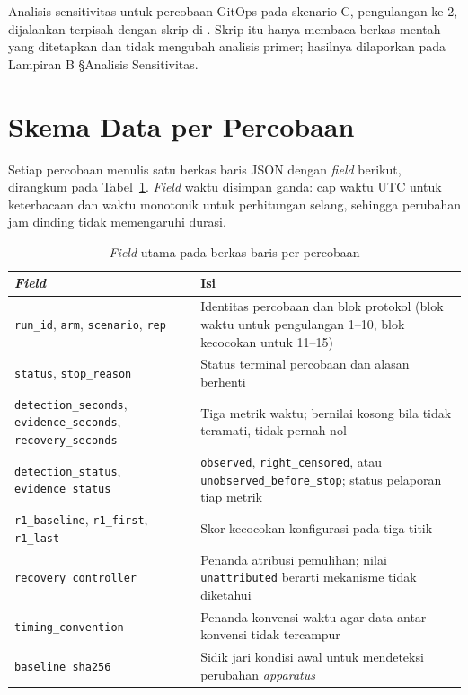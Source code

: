Analisis sensitivitas untuk percobaan GitOps pada skenario C, pengulangan ke-2, dijalankan terpisah dengan skrip di . Skrip itu hanya membaca berkas mentah yang ditetapkan dan tidak mengubah analisis primer; hasilnya dilaporkan pada Lampiran B §Analisis Sensitivitas.

\section{Skema Data per Percobaan}

Setiap percobaan menulis satu berkas baris JSON dengan \textit{field} berikut, dirangkum pada Tabel~\ref{tab:lampiran-skema}. \textit{Field} waktu disimpan ganda: cap waktu UTC untuk keterbacaan dan waktu monotonik untuk perhitungan selang, sehingga perubahan jam dinding tidak memengaruhi durasi.

\begin{table}[htbp]
  \centering
  \small
  \caption{\textit{Field} utama pada berkas baris per percobaan}
  \label{tab:lampiran-skema}
  \begin{tabularx}{\textwidth}{|>{\raggedright\arraybackslash}p{5.4cm}|>{\raggedright\arraybackslash}X|}
    \hline
    \textit{Field} & Isi \\
    \hline
    \texttt{run\_id}, \texttt{arm}, \texttt{scenario}, \texttt{rep} & Identitas percobaan dan blok protokol (blok waktu untuk pengulangan 1--10, blok kecocokan untuk 11--15) \\
    \hline
    \texttt{status}, \texttt{stop\_reason} & Status terminal percobaan dan alasan berhenti \\
    \hline
    \texttt{detection\_seconds}, \texttt{evidence\_seconds}, \texttt{recovery\_seconds} & Tiga metrik waktu; bernilai kosong bila tidak teramati, tidak pernah nol \\
    \hline
    \texttt{detection\_status}, \texttt{evidence\_status} & \texttt{observed}, \texttt{right\_censored}, atau \texttt{unobserved\_before\_stop}; status pelaporan tiap metrik \\
    \hline
    \texttt{r1\_baseline}, \texttt{r1\_first}, \texttt{r1\_last} & Skor kecocokan konfigurasi pada tiga titik \\
    \hline
    \texttt{recovery\_controller} & Penanda atribusi pemulihan; nilai \texttt{unattributed} berarti mekanisme tidak diketahui \\
    \hline
    \texttt{timing\_convention} & Penanda konvensi waktu agar data antar-konvensi tidak tercampur \\
    \hline
    \texttt{baseline\_sha256} & Sidik jari kondisi awal untuk mendeteksi perubahan \textit{apparatus} \\
    \hline
  \end{tabularx}
\end{table}

